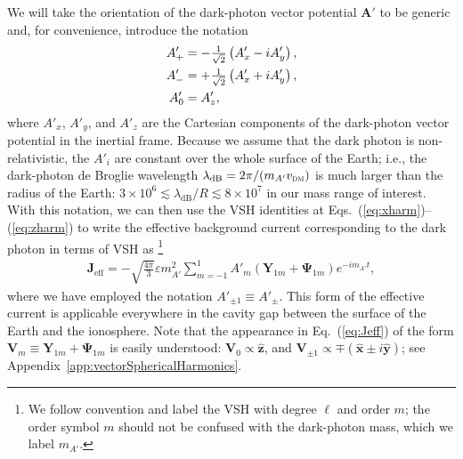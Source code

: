 \documentclass[amsmath,amssymb,aps,10pt,prd,letterpaper,nofootinbib,balancelastpage,notitlepage,superscriptaddress,twocolumn,floatfix]{revtex4-2}
\newcommand{\appref}[2][x]{Appendi{#1}~\ref{#2}}	%
\renewcommand{\eqref}[2][]{Eq{#1}.~(\ref{eq:#2})}	%
\newcommand{\eqrefRange}[2]{Eqs.~(\ref{eq:#1})--(\ref{eq:#2})}
\newcommand{\lb}{\ensuremath{\left}}					%
\newcommand{\rb}{\ensuremath{\right}}					%
\begin{document}
We will take the orientation of the dark-photon vector potential $\bm{A}'$ to be generic and, for convenience, introduce the notation
\begin{align}
	A'_+ &= -\tfrac{1}{\sqrt{2}} \lb(A'_x - iA'_y \rb), \label{eq:Aplus}\\
	A'_- &= +\tfrac{1}{\sqrt{2}} \lb(A'_x + iA'_y \rb), \label{eq:Aminus}\\
	A'_0 &= A'_z, \label{eq:Azero}
\end{align}
where $A'_x$, $A'_y$, and $A'_z$ are the Cartesian components of the dark-photon vector potential in the inertial frame.
Because we assume that the dark photon is non-relativistic, the $A'_i$ are constant over the whole surface of the Earth; i.e., the dark-photon de Broglie wavelength $\lambda_{\text{dB}} = 2\pi/ (m_{A'}v_{\textsc{dm}})$ is much larger than the radius of the Earth: $3 \times 10^6 \lesssim \lambda_{\text{dB}} / R \lesssim 8\times 10^7$ in our mass range of interest.
With this notation, we can then use the VSH identities at \eqrefRange{xharm}{zharm} to write the effective background current corresponding to the dark photon in terms of VSH as%
\footnote{\label{ftnt:VSHnotation}%
    We follow convention and label the VSH with degree $\ell$ and order $m$; the order symbol $m$ should not be confused with the dark-photon mass, which we label $m_{A'}$.
} %
\begin{align}
    \bm{J}_\text{eff}=-\sqrt{\frac{4\pi}3}\varepsilon m_{A'}^2\sum_{m=-1}^1A'_m(\bm{Y}_{1m}+\bm{\Psi}_{1m})e^{-im_{A'}t}, \label{eq:Jeff}
\end{align}
where we have employed the notation $A'_{\pm1}\equiv A'_\pm$.
This form of the effective current is applicable everywhere in the cavity gap between the surface of the Earth and the ionosphere.
Note that the appearance in \eqref{Jeff} of the form $\bm{V}_{m} \equiv \bm{Y}_{1m}+\bm{\Psi}_{1m}$ is easily understood: $\bm{V}_0 \propto \bm{\hat{z}}$, and $\bm{V}_{\pm1} \propto \mp ( \bm{\hat{x}} \pm i \bm{\hat{y}})$; see \appref{app:vectorSphericalHarmonics}.
\end{document}
